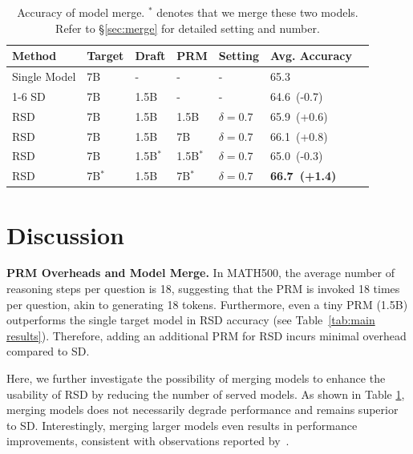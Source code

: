 \documentclass{article}
\theoremstyle{plain}
\theoremstyle{definition}
\theoremstyle{remark}
\begin{document}
\begin{table}[t]
\caption{Accuracy of model merge. $^{*}$ denotes that we merge these two models. Refer to \S\ref{sec:merge} for detailed setting and number.}
\label{tab:merge}
\vskip 0.1in
\tiny
\begin{center}
\begin{tabular}{llllllc} 
\toprule
\textbf{Method} & \textbf{Target} & \textbf{Draft} & \textbf{PRM} & \textbf{Setting} & \textbf{Avg. Accuracy} \\
\midrule
Single Model & 7B & - & - & - & 65.3 \\
\cmidrule(lr){1-6}
SD & 7B & 1.5B & - & - & 64.6~(-0.7)\\
\rowcolor{blue!8}
RSD & 7B & 1.5B & 1.5B & $\delta=0.7$ & 65.9~(+0.6)\\
\rowcolor{blue!8}
RSD & 7B & 1.5B & 7B & $\delta=0.7$ & 66.1~(+0.8)\\
\rowcolor{orange!8}
RSD & 7B & 1.5B$^{*}$ & 1.5B$^{*}$ & $\delta=0.7$ & 65.0~(-0.3) \\
\rowcolor{orange!8}
RSD & 7B$^{*}$ & 1.5B & 7B$^{*}$ & $\delta=0.7$ & \textbf{66.7~(+1.4)}\\
\bottomrule
\end{tabular}
\end{center}
\vskip -0.1in
\vspace{-1em}
\end{table}

\section{Discussion}
\textbf{PRM Overheads and Model Merge.} In MATH500, the average number of reasoning steps per question is 18, suggesting that the PRM is invoked 18 times per question, akin to generating 18 tokens. Furthermore, even a tiny PRM (1.5B) outperforms the single target model in RSD accuracy (see Table~\ref{tab:main results}). Therefore, adding an additional PRM for RSD incurs minimal overhead compared to SD.

Here, we further investigate the possibility of merging models to enhance the usability of RSD by reducing the number of served models. As shown in Table \ref{tab:merge}, merging models does not necessarily degrade performance and remains superior to SD. Interestingly, merging larger models even results in performance improvements, consistent with observations reported by~\citet{mergeprateek}.
\end{document}
